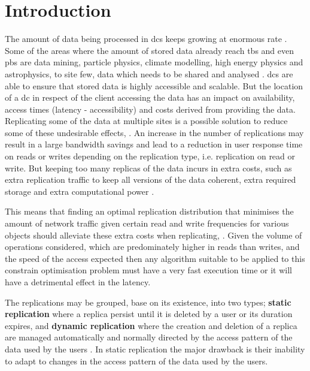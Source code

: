\documentclass[english]{article}
\begin{document}
\section{Introduction}
	The amount of data being processed in \glspl{dc} keeps growing at enormous rate \cite{Tolle2011a, Cisco2014a, Chanthadavong2014a}. Some of the areas where the amount of stored data already reach \glspl{tb} and even \glspl{pb} are data mining, particle physics, climate modelling, high energy physics and astrophysics, to site few, data which needs to be shared and analysed \cite{KingsyGrace2013a, MohdZin2012a, Naseera2009a}. \glspl{dc} are able to ensure that stored data is highly accessible and scalable. But the location of a \gls{dc} in respect of the client accessing the data has an impact on availability, access times (latency - accessibility) and costs derived from providing the data. Replicating some of the data at multiple sites is a possible solution to reduce some of these undesirable effects, \cite{Briquemont2014a, Abad2011a, Venugopal2006a}. An increase in the number of replications may result in a large bandwidth savings and lead to a reduction in user response time on reads or writes depending on the replication type, i.e. replication on read or write. But keeping too many replicas of the data incurs in extra costs, such as extra replication traffic to keep all versions of the data coherent, extra required storage and extra computational power \cite{Goel2006a}.
	
	This means that finding an optimal replication distribution that minimises the amount of network traffic given certain read and write frequencies for various objects should alleviate these extra costs when replicating, \cite{Wolfson1990a, Briquemont2014a}. Given the volume of operations considered, which are predominately higher in reads than writes, and the speed of the access expected then any algorithm suitable to be applied to this constrain optimisation problem must have a very fast execution time or it will have a detrimental effect in the latency.

	The replications may be grouped, base on its existence, into two types; {\bf static replication} where a replica persist until it is deleted by a user or its duration expires, and {\bf dynamic replication} where the creation and deletion of a replica are managed automatically and normally directed by the access pattern of the data used by the users \cite{Dong2008a}. In static replication the major drawback is their inability to adapt to changes in the access pattern of the data used by the users.
	
\end{document}
